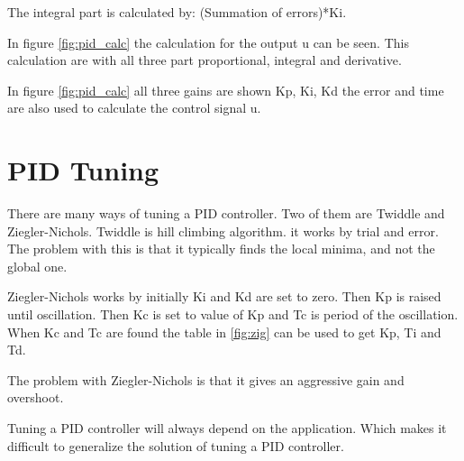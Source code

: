 
The integral part is calculated by: (Summation of errors)*Ki. 

In figure \ref{fig:pid_calc} the calculation for the output u can be seen. This calculation are with all three part proportional, integral and derivative.


In figure \ref{fig:pid_calc} all three gains are shown {Kp, Ki, Kd} the error and time are also used to calculate the control signal u.

\section{PID Tuning}

There are many ways of tuning a PID controller. Two of them are Twiddle and Ziegler-Nichols.
Twiddle is hill climbing algorithm. it works by trial and error. The problem with this is that it typically finds the local minima, and not the global one. 

Ziegler-Nichols works by initially Ki and Kd are set to zero. Then Kp is raised until oscillation. Then Kc is set to value of Kp and Tc is period of the oscillation. When Kc and Tc are found the table in \ref{fig:zig} can be used to get Kp, Ti and Td.


The problem with Ziegler-Nichols is that it gives an aggressive gain and overshoot. 

Tuning a PID controller will always depend on the application. Which makes it difficult to generalize the solution of tuning a PID controller.
